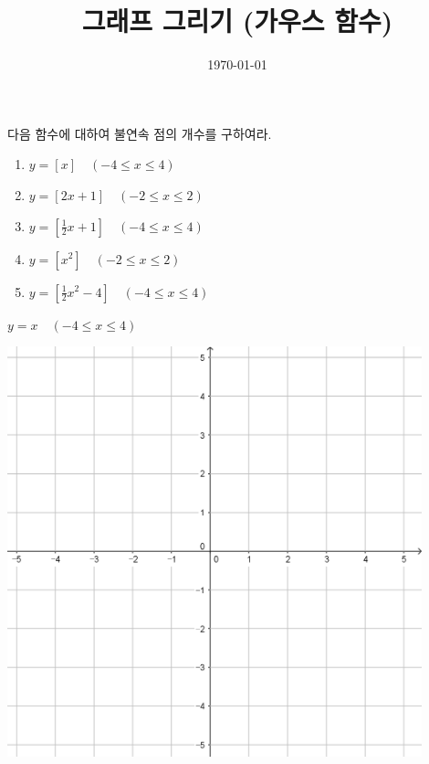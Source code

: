 \documentclass[a4paper]{oblivoir}
\title{그래프 그리기 (가우스 함수)}
\date{\today}
\author{}
\newcounter{num}
\begin{document}
\maketitle

\noindent
다음 함수에 대하여 불연속 점의 개수를 구하여라.
\begin{enumerate}[label = (\arabic*)]%
\item
\(y=[x]\quad(-4\le x\le4)\)
\item
\(y=[2x+1]\quad(-2\le x\le2)\)
\item
\(y=[\frac12x+1]\quad(-4\le x\le4)\)
\item
\(y=[x^2]\quad(-2\le x\le2)\)
\item
\(y=[\frac12x^2-4]\quad(-4\le x\le4)\)
\end{enumerate}

\bigskip\bigskip\bigskip\bigskip
\begin{minipage}{0.45\textwidth}\centering
\(y=x\quad(-4\le x\le4)\)
\par\bigskip\includegraphics[width=0.9\textwidth]{55}
\end{minipage}
\end{document}
